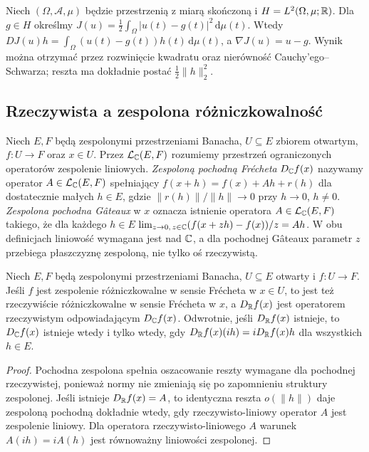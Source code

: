 \begin{przyklad}
\label{ex:integral-functional14}
Niech $(\Omega,\mathcal A,\mu)$ będzie przestrzenią z miarą skończoną i $H=L^2(\Omega,\mu;\mathbb R)$. Dla $g\in H$ określmy $J(u)=\frac12\int_\Omega |u(t)-g(t)|^2\,\mathrm d\mu(t)$. Wtedy
$DJ(u)h=\int_\Omega (u(t)-g(t))h(t)\,\mathrm d\mu(t)$,
a $\nabla J(u)=u-g$. Wynik można otrzymać przez rozwinięcie kwadratu oraz nierówność Cauchy'ego--Schwarza; reszta ma dokładnie postać $\frac12\|h\|_2^2$.
\end{przyklad}

\subsection{Rzeczywista a zespolona różniczkowalność}

\begin{definicja}
\label{def:complex-differentiability14}
Niech $E,F$ będą zespolonymi przestrzeniami Banacha, $U\subseteq E$ zbiorem otwartym, $f:U\to F$ oraz $x\in U$. Przez $\mathcal L_{\mathbb C}(E,F)$ rozumiemy przestrzeń ograniczonych operatorów zespolenie liniowych. \emph{Zespoloną pochodną Frécheta} $D_{\mathbb C}f(x)$ nazywamy operator $A\in\mathcal L_{\mathbb C}(E,F)$ spełniający $f(x+h)=f(x)+Ah+r(h)$ dla dostatecznie małych $h\in E$, gdzie $\|r(h)\|/\|h\|\to0$ przy $h\to0$, $h\ne0$. \emph{Zespolona pochodna Gâteaux} w $x$ oznacza istnienie operatora $A\in\mathcal L_{\mathbb C}(E,F)$ takiego, że dla każdego $h\in E$
$\lim_{z\to0,\,z\in\mathbb C}(f(x+zh)-f(x))/z=Ah$.
W obu definicjach liniowość wymagana jest nad $\mathbb C$, a dla pochodnej Gâteaux parametr $z$ przebiega płaszczyznę zespoloną, nie tylko oś rzeczywistą.
\end{definicja}

\begin{stwierdzenie}
\label{prop:complex-real14}
Niech $E,F$ będą zespolonymi przestrzeniami Banacha, $U\subseteq E$ otwarty i $f:U\to F$. Jeśli $f$ jest zespolenie różniczkowalne w sensie Frécheta w $x\in U$, to jest też rzeczywiście różniczkowalne w sensie Frécheta w $x$, a $D_{\mathbb R}f(x)$ jest operatorem rzeczywistym odpowiadającym $D_{\mathbb C}f(x)$. Odwrotnie, jeśli $D_{\mathbb R}f(x)$ istnieje, to $D_{\mathbb C}f(x)$ istnieje wtedy i tylko wtedy, gdy $D_{\mathbb R}f(x)(ih)=iD_{\mathbb R}f(x)h$ dla wszystkich $h\in E$.
\end{stwierdzenie}
\begin{proof}
Pochodna zespolona spełnia oszacowanie reszty wymagane dla pochodnej rzeczywistej, ponieważ normy nie zmieniają się po zapomnieniu struktury zespolonej. Jeśli istnieje $D_{\mathbb R}f(x)=A$, to identyczna reszta $o(\|h\|)$ daje zespoloną pochodną dokładnie wtedy, gdy rzeczywisto-liniowy operator $A$ jest zespolenie liniowy. Dla operatora rzeczywisto-liniowego $A$ warunek $A(ih)=iA(h)$ jest równoważny liniowości zespolonej.
\end{proof}

